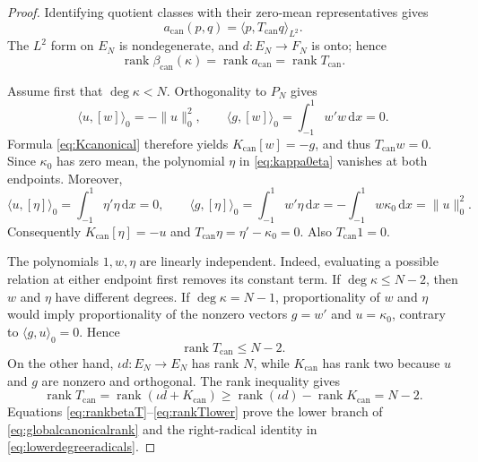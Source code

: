 \documentclass[11pt,a4paper]{article}
\theoremstyle{definition}
\theoremstyle{remark}
\newcommand{\rank}{\operatorname{rank}}
\newcommand{\dd}{\,\mathrm{d}}
\begin{document}
\begin{proof}
Identifying quotient classes with their zero-mean representatives gives
\[
 a_{\mathrm{can}}(p,q)=\langle p,T_{\mathrm{can}}q\rangle_{L^2}.
\]
The $L^2$ form on $E_N$ is nondegenerate, and $d:E_N\to F_N$ is onto; hence
\begin{equation}\label{eq:rankbetaT}
 \rank\beta_{\mathrm{can}}(\kappa)=\rank a_{\mathrm{can}}
 =\rank T_{\mathrm{can}}.
\end{equation}

Assume first that $\deg\kappa<N$.  Orthogonality to $P_N$ gives
\begin{equation}\label{eq:lowerdegreeinnerproducts}
 \langle u,[w]\rangle_0=-\|u\|_0^2,
 \qquad
 \langle g,[w]\rangle_0=\int_{-1}^{1}w'w\dd x=0.
\end{equation}
Formula \eqref{eq:Kcanonical} therefore yields $K_{\mathrm{can}}[w]=-g$, and thus
$T_{\mathrm{can}}w=0$.  Since $\kappa_0$ has zero mean, the polynomial $\eta$ in
\eqref{eq:kappa0eta} vanishes at both endpoints.  Moreover,
\begin{equation}\label{eq:etainnerproducts}
 \langle u,[\eta]\rangle_0
 =\int_{-1}^{1}\eta'\eta\dd x=0,
 \qquad
 \langle g,[\eta]\rangle_0
 =\int_{-1}^{1}w'\eta\dd x
 =-\int_{-1}^{1}w\kappa_0\dd x
 =\|u\|_0^2.
\end{equation}
Consequently $K_{\mathrm{can}}[\eta]=-u$ and
$T_{\mathrm{can}}\eta=\eta'-\kappa_0=0$.  Also $T_{\mathrm{can}}1=0$.

The polynomials $1,w,\eta$ are linearly independent.  Indeed, evaluating a possible
relation at either endpoint first removes its constant term.  If $\deg\kappa\leq N-2$,
then $w$ and $\eta$ have different degrees.  If $\deg\kappa=N-1$, proportionality of
$w$ and $\eta$ would imply proportionality of the nonzero vectors $g=w'$ and $u=\kappa_0$,
contrary to $\langle g,u\rangle_0=0$.  Hence
\begin{equation}\label{eq:rankTupper}
 \rank T_{\mathrm{can}}\leq N-2.
\end{equation}
On the other hand, $\iota d:E_N\to E_N$ has rank $N$, while $K_{\mathrm{can}}$ has rank two
because $u$ and $g$ are nonzero and orthogonal.  The rank inequality gives
\begin{equation}\label{eq:rankTlower}
 \rank T_{\mathrm{can}}=\rank(\iota d+K_{\mathrm{can}})
 \geq\rank(\iota d)-\rank K_{\mathrm{can}}=N-2.
\end{equation}
Equations \eqref{eq:rankbetaT}--\eqref{eq:rankTlower} prove the lower branch of
\eqref{eq:globalcanonicalrank} and the right-radical identity in
\eqref{eq:lowerdegreeradicals}.


\end{proof}
\end{document}
